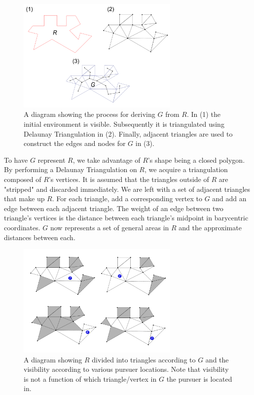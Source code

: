 \documentclass{article}
\begin{document}
\begin{figure}[htb]
\centering
\includegraphics[width=0.7\textwidth]{"trangulation"}
\caption{A diagram showing the process for deriving \(G\) from \(R\). In (1) the initial environment is visible. Subsequently it is triangulated using Delaunay Triangulation in (2). Finally, adjacent triangles are used to construct the edges and nodes for \(G\) in (3).}
\end{figure}

To have \(G\) represent \(R\), we take advantage of \(R\)'s shape being a closed polygon. By performing a Delaunay Triangulation on \(R\), we acquire a triangulation composed of \(R\)'s vertices. \cite{dTri} It is assumed that the triangles outside of \(R\) are "stripped" and discarded immediately. We are left with a set of adjacent triangles that make up \(R\). For each triangle, add a corresponding vertex to \(G\) and add an edge between each adjacent triangle. The weight of an edge between two triangle's vertices is the distance between each triangle's midpoint in barycentric coordinates. \cite{bCenter} \(G\) now represents a set of general areas in \(R\) and the approximate distances between each.

\begin{figure}[htb]
\centering
\includegraphics[width=0.7\textwidth]{"visibility"}
\caption{A diagram showing \(R\) divided into triangles according to \(G\) and the visibility according to various pursuer locations. Note that visibility is not a function of which triangle/vertex in \(G\) the pursuer is located in.}
\end{figure}
\end{document}
